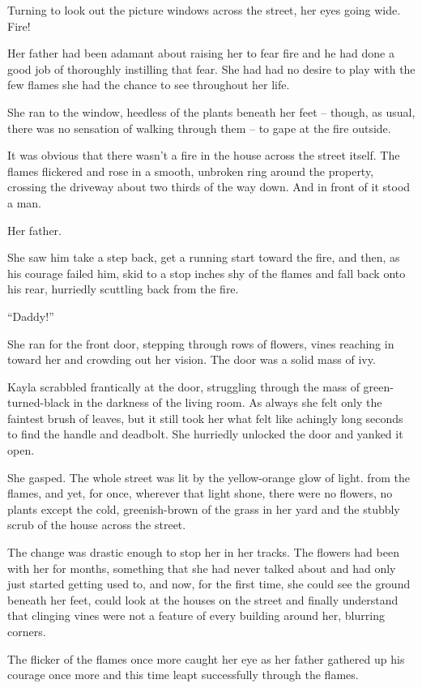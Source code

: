 Turning to look out the picture windows across the street, her eyes going wide.  Fire!

Her father had been adamant about raising her to fear fire and he had done a good job of thoroughly instilling that fear.  She had had no desire to play with the few flames she had the chance to see throughout her life.

She ran to the window, heedless of the plants beneath her feet -- though, as usual, there was no sensation of walking through them -- to gape at the fire outside.

It was obvious that there wasn't a fire in the house across the street itself.  The flames flickered and rose in a smooth, unbroken ring around the property, crossing the driveway about two thirds of the way down.  And in front of it stood a man.

Her father.

She saw him take a step back, get a running start toward the fire, and then, as his courage failed him, skid to a stop inches shy of the flames and fall back onto his rear, hurriedly scuttling back from the fire.

``Daddy!''

She ran for the front door, stepping through rows of flowers, vines reaching in toward her and crowding out her vision.  The door was a solid mass of ivy.

Kayla scrabbled frantically at the door, struggling through the mass of green-turned-black in the darkness of the living room.  As always she felt only the faintest brush of leaves, but it still took her what felt like achingly long seconds to find the handle and deadbolt.  She hurriedly unlocked the door and yanked it open.

She gasped.  The whole street was lit by the yellow-orange glow of light. from the flames, and yet, for once, wherever that light shone, there were no flowers, no plants except the cold, greenish-brown of the grass in her yard and the stubbly scrub of the house across the street.

The change was drastic enough to stop her in her tracks.  The flowers had been with her for months, something that she had never talked about and had only just started getting used to, and now, for the first time, she could see the ground beneath her feet, could look at the houses on the street and finally understand that clinging vines were not a feature of every building around her, blurring corners.

The flicker of the flames once more caught her eye as her father gathered up his courage once more and this time leapt successfully through the flames.

